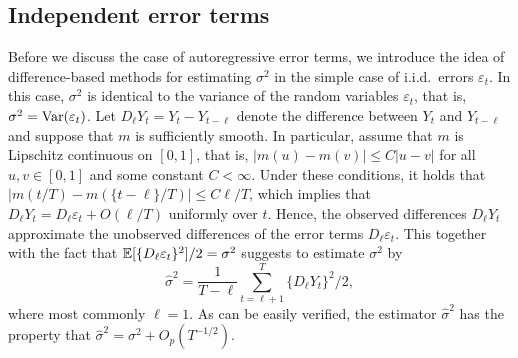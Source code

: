 

\subsection{Independent error terms} 


Before we discuss the case of autoregressive error terms, we introduce the idea of difference-based methods for estimating $\sigma^2$ in the simple case of i.i.d.\ errors $\varepsilon_t$. In this case, $\sigma^2$ is identical to the variance of the random variables $\varepsilon_t$, that is, $\sigma^2 = \textnormal{Var}(\varepsilon_t)$. Let $D_\ell Y_t = Y_t - Y_{t-\ell}$ denote the difference between $Y_t$ and $Y_{t-\ell}$ and suppose that $m$ is sufficiently smooth. In particular, assume that $m$ is Lipschitz continuous on $[0,1]$, that is, $|m(u) - m(v)| \le C|u - v|$ for all $u,v \in [0,1]$ and some constant $C < \infty$. Under these conditions, it holds that $|m(t/T) - m(\{t-\ell\}/T)| \le C \ell/T$, which implies that $D_\ell Y_t = D_\ell \varepsilon_t + O(\ell/T)$ uniformly over $t$. Hence, the observed differences $D_\ell Y_t$ approximate the unobserved differences of the error terms $D_\ell \varepsilon_t$. This together with the fact that $\mathbb{E}[ \{D_\ell \varepsilon_t\}^2]/2 = \sigma^2$ suggests to estimate $\sigma^2$ by 
\[ \widehat{\sigma}^2 = \frac{1}{T-\ell} \sum\limits_{t=\ell+1}^T \{ D_\ell Y_t \}^2 \big/ 2, \]
where most commonly $\ell = 1$. As can be easily verified, the estimator $\widehat{\sigma}^2$ has the property that $\widehat{\sigma}^2 = \sigma^2 + O_p(T^{-1/2})$. 


